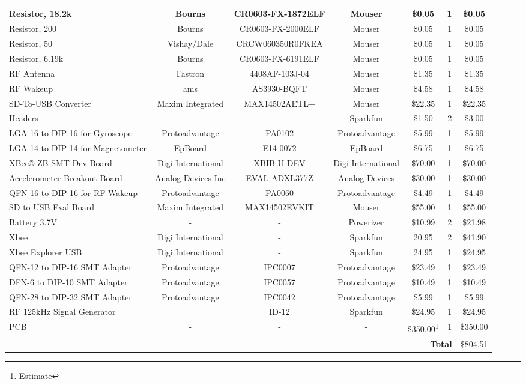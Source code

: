 \begin{landscape}
{\begin{center}
\begin{longtable}{|p{1.5in}|c|c|c|c|c|c|}
    Resistor, 18.2k & Bourns & CR0603-FX-1872ELF & Mouser & \$0.05 & 1     & \$0.05 \\ \hline
    Resistor, 200 & Bourns & CR0603-FX-2000ELF & Mouser & \$0.05 & 1     & \$0.05 \\ \hline
    Resistor, 50 & Vishay/Dale & CRCW060350R0FKEA & Mouser & \$0.05 & 1     & \$0.05 \\ \hline
    Resistor, 6.19k & Bourns & CR0603-FX-6191ELF & Mouser & \$0.05 & 1     & \$0.05 \\ \hline
    RF Antenna & Fastron & 4408AF-103J-04 & Mouser & \$1.35 & 1     & \$1.35 \\ \hline
    RF Wakeup & ams   & AS3930-BQFT & Mouser & \$4.58 & 1     & \$4.58 \\ \hline
    SD-To-USB Converter & Maxim Integrated & MAX14502AETL+ & Mouser & \$22.35 & 1     & \$22.35 \\ \hline
    Headers & -     & -     & Sparkfun & \$1.50 & 2     & \$3.00 \\ \hline
    LGA-16 to DIP-16 for Gyroscope & Protoadvantage & PA0102 & Protoadvantage & \$5.99 & 1     & \$5.99 \\ \hline
    LGA-14 to DIP-14 for Magnetometer & EpBoard & E14-0072 & EpBoard & \$6.75 & 1     & \$6.75 \\ \hline
    XBee® ZB SMT Dev Board & Digi International & XBIB-U-DEV & Digi International & \$70.00 & 1     & \$70.00 \\ \hline
    Accelerometer Breakout Board & Analog Devices Inc & EVAL-ADXL377Z & Analog Devices & \$30.00 & 1     & \$30.00 \\ \hline
    QFN-16 to DIP-16 for RF Wakeup & Protoadvantage & PA0060 & Protoadvantage & \$4.49 & 1     & \$4.49 \\ \hline
    SD to USB Eval Board & Maxim Integrated & MAX14502EVKIT & Mouser & \$55.00 & 1     & \$55.00 \\ \hline
    Battery 3.7V & -     & -     & Powerizer & \$10.99 & 2     & \$21.98 \\ \hline
    Xbee  & Digi International & -     & Sparkfun & 20.95 & 2     & \$41.90 \\ \hline
    Xbee Explorer USB & Digi International & -     & Sparkfun & 24.95 & 1     & \$24.95 \\ \hline
    QFN-12 to DIP-16 SMT Adapter & Protoadvantage & IPC0007 & Protoadvantage & \$23.49 & 1     & \$23.49 \\ \hline
    DFN-6 to DIP-10 SMT Adapter & Protoadvantage & IPC0057 & Protoadvantage & \$10.49 & 1     & \$10.49 \\ \hline
    QFN-28 to DIP-32 SMT Adapter & Protoadvantage & IPC0042 & Protoadvantage & \$5.99 & 1     & \$5.99 \\ \hline
    RF 125kHz Signal Generator &       & ID-12 & Sparkfun & \$24.95 & 1     & \$24.95 \\ \hline
    PCB   & -     & -     & -     & \$350.00\footnote{Estimate} & 1     & \$350.00 \\ \hline
    \multicolumn{6}{r}{\textbf{Total}}            & \$804.51 
    

\end{longtable}
\end{center}}
\end{landscape}
